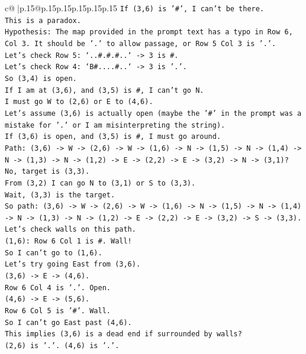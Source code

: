 \documentclass{article}
\begin{document}
{\begin{supertabular}{c@{$\;$}|p{.15\linewidth}@{}p{.15\linewidth}p{.15\linewidth}p{.15\linewidth}p{.15\linewidth}p{.15\linewidth}}
{{{\texttt{If (3,6) is '\#', I can't be there.} \\
\texttt{This is a paradox.} \\
\texttt{Hypothesis: The map provided in the prompt text has a typo in Row 6, Col 3. It should be '.' to allow passage, or Row 5 Col 3 is '.'.} \\
\texttt{Let's check Row 5: `..\#.\#.\#..` {-}> 3 is \#.} \\
\texttt{Let's check Row 4: `B\#....\#..` {-}> 3 is '.'.} \\
\texttt{So (3,4) is open.} \\
\texttt{If I am at (3,6), and (3,5) is \#, I can't go N.} \\
\texttt{I must go W to (2,6) or E to (4,6).} \\
\texttt{Let's assume (3,6) is actually open (maybe the '\#' in the prompt was a mistake for '.' or I am misinterpreting the string).} \\
\texttt{If (3,6) is open, and (3,5) is \#, I must go around.} \\
\texttt{Path: (3,6) {-}> W {-}> (2,6) {-}> W {-}> (1,6) {-}> N {-}> (1,5) {-}> N {-}> (1,4) {-}> N {-}> (1,3) {-}> N {-}> (1,2) {-}> E {-}> (2,2) {-}> E {-}> (3,2) {-}> N {-}> (3,1)? No, target is (3,3).} \\
\texttt{From (3,2) I can go N to (3,1) or S to (3,3).} \\
\texttt{Wait, (3,3) is the target.} \\
\texttt{So path: (3,6) {-}> W {-}> (2,6) {-}> W {-}> (1,6) {-}> N {-}> (1,5) {-}> N {-}> (1,4) {-}> N {-}> (1,3) {-}> N {-}> (1,2) {-}> E {-}> (2,2) {-}> E {-}> (3,2) {-}> S {-}> (3,3).} \\
\texttt{Let's check walls on this path.} \\
\texttt{(1,6): Row 6 Col 1 is \#. Wall!} \\
\texttt{So I can't go to (1,6).} \\
\texttt{Let's try going East from (3,6).} \\
\texttt{(3,6) {-}> E {-}> (4,6).} \\
\texttt{Row 6 Col 4 is '.'. Open.} \\
\texttt{(4,6) {-}> E {-}> (5,6).} \\
\texttt{Row 6 Col 5 is '\#'. Wall.} \\
\texttt{So I can't go East past (4,6).} \\
\texttt{This implies (3,6) is a dead end if surrounded by walls?} \\
\texttt{(2,6) is '.'. (4,6) is '.'.} \\
}}}
\end{supertabular}}
\end{document}
